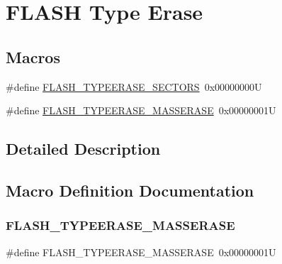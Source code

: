 \hypertarget{group___f_l_a_s_h_ex___type___erase}{}\section{F\+L\+A\+SH Type Erase}
\label{group___f_l_a_s_h_ex___type___erase}
\subsection*{Macros}
\begin{DoxyCompactItemize}
\item 
\#define \hyperlink{group___f_l_a_s_h_ex___type___erase_gaee700cbbc746cf72fca3ebf07ee20c4e}{F\+L\+A\+S\+H\+\_\+\+T\+Y\+P\+E\+E\+R\+A\+S\+E\+\_\+\+S\+E\+C\+T\+O\+RS}~0x00000000U
\item 
\#define \hyperlink{group___f_l_a_s_h_ex___type___erase_ga9bc03534e69c625e1b4f0f05c3852243}{F\+L\+A\+S\+H\+\_\+\+T\+Y\+P\+E\+E\+R\+A\+S\+E\+\_\+\+M\+A\+S\+S\+E\+R\+A\+SE}~0x00000001U
\end{DoxyCompactItemize}


\subsection{Detailed Description}


\subsection{Macro Definition Documentation}
\mbox{\label{group___f_l_a_s_h_ex___type___erase_ga9bc03534e69c625e1b4f0f05c3852243}} 
\subsubsection{\texorpdfstring{F\+L\+A\+S\+H\+\_\+\+T\+Y\+P\+E\+E\+R\+A\+S\+E\+\_\+\+M\+A\+S\+S\+E\+R\+A\+SE}{FLASH\_TYPEERASE\_MASSERASE}}
{\footnotesize\ttfamily \#define F\+L\+A\+S\+H\+\_\+\+T\+Y\+P\+E\+E\+R\+A\+S\+E\+\_\+\+M\+A\+S\+S\+E\+R\+A\+SE~0x00000001U}

